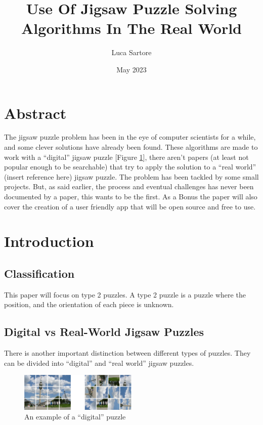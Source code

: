 \documentclass{article}
\title{Use Of Jigsaw Puzzle Solving Algorithms In The Real World}
\author{Luca Sartore}
\date{May 2023}
\begin{document}
\maketitle

\newpage

\tableofcontents

\newpage

\section{Abstract}
The jigsaw puzzle problem has been in the eye of computer scientists for a while,
and some clever solutions have already been found. These algorithms are made to
work with a “digital” jigsaw puzzle [Figure \ref{fig:figure_digital_puzzle}], there aren't papers
(at least not popular enough to be searchable) that try to apply the solution
to a “real world” (insert reference here) jigsaw puzzle.\newline
The problem has been tackled by some small projects. But, as said earlier,
the process and eventual challenges has never been documented by a paper,
this wants to be the first.\newline
As a Bonus the paper will also cover the creation of a user friendly app
that will be open source and free to use.

\section{Introduction}
\subsection{Classification}
This paper will focus on type 2 puzzles. A type 2 puzzle is a puzzle where the position, and the orientation of each piece is unknown. 
\subsection{Digital vs Real-World Jigsaw Puzzles}

There is  another important distinction between different types of puzzles. They can be divided into “digital” and “real world” jigsaw puzzles.

\bigskip


    
    \begin{figure}[h]
        \caption{An example of a “digital” puzzle}
        \label{fig:figure_digital_puzzle}
        \centering
        \includegraphics[width=0.5\textwidth]{pictures/digital_puzzle.png}
    \end{figure}
\end{document}
